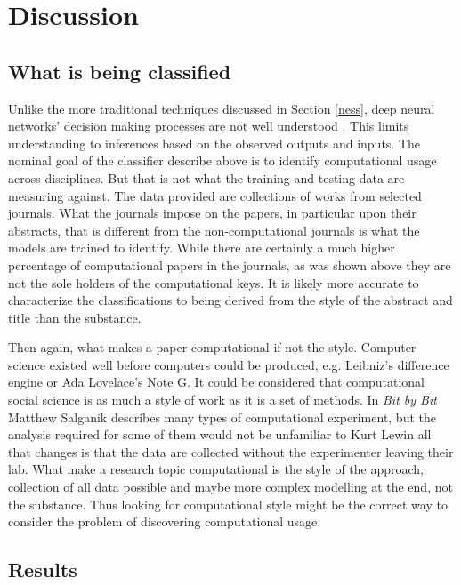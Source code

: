 \documentclass[12pt, a4paper]{article}
\begin{document}
\section{Discussion}

\subsection{What is being classified}

Unlike the more traditional techniques discussed in Section \ref{ness}, deep neural networks' decision making processes are not well understood \citep{deep_learning_chapter12}. This limits understanding to inferences based on the observed outputs and inputs. The nominal goal of the classifier describe above is to identify computational usage across disciplines. But that is not what the training and testing data are measuring against. The data provided are collections of works from selected journals. What the journals impose on the papers, in particular upon their abstracts, that is different from the non-computational journals is what the models are trained to identify. While there are certainly a much higher percentage of computational papers in the journals, as was shown above they are not the sole holders of the computational keys. It is likely more accurate to characterize the classifications to being derived from the style of the abstract and title than the substance.

Then again, what makes a paper computational if not the style. Computer science existed well before computers could be produced, e.g. Leibniz's difference engine or Ada Lovelace's Note G. It could be considered that computational social science is as much a style of work as it is a set of methods. In \textit{Bit by Bit} Matthew Salganik \citep{salganik2017bit} describes many types of computational experiment, but the analysis required for some of them would not be unfamiliar to Kurt Lewin \citep{lewin1939field} all that changes is that the data are collected without the experimenter leaving their lab. What make a research topic computational is the style of the approach, collection of all data possible and maybe more complex modelling at the end, not the substance. Thus looking for computational style might be the correct way to consider the problem of discovering computational usage.

\subsection{Results}
\end{document}
